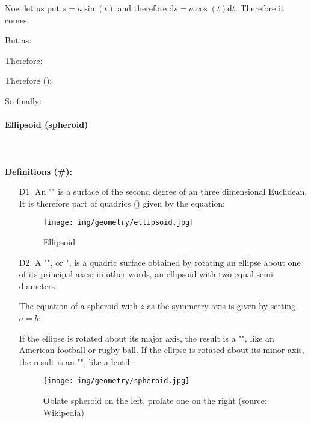 {	Now let us put $s=a\sin(t)$ and therefore $\mathrm{d}s=a\cos(t)\mathrm{d}t$. Therefore it comes:
	
	But as:
	
	Therefore:
	
	Therefore ():
	
	So finally:
	
	
	\paragraph{Ellipsoid (spheroid)}\mbox{}\\\\
	\textbf{Definitions (\#\mydef):}
	\begin{enumerate}
		\item[D1.] An "" is a surface of the second degree of an three dimensional Euclidean. It is therefore part of quadrics () given by the equation:
		
		\begin{figure}[H]
			\centering
			\texttt{[image: img/geometry/ellipsoid.jpg]}
			\caption{Ellipsoid}
		\end{figure}

		\item[D2.] A "", or ", is a quadric surface obtained by rotating an ellipse about one of its principal axes; in other words, an ellipsoid with two equal semi-diameters.
		
	The equation of a spheroid with $z$ as the symmetry axis is given by setting $a = b$:
	

	If the ellipse is rotated about its major axis, the result is a "", like an American football or rugby ball. If the ellipse is rotated about its minor axis, the result is an "", like a lentil:
		\begin{figure}[H]
			\centering
			\texttt{[image: img/geometry/spheroid.jpg]}
			\caption[Oblate spheroid on the left, prolate one on the right]{Oblate spheroid on the left, prolate one on the right (source: Wikipedia)}
		\end{figure}
	\end{enumerate}

}
